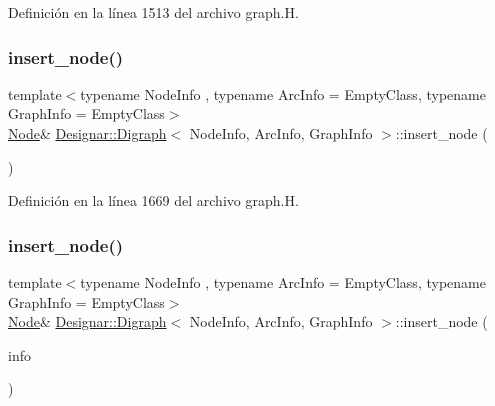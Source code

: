 Definición en la línea 1513 del archivo graph.\+H.

\mbox{\label{class_designar_1_1_digraph_a6ee69792c537ce241a2e448da1b46f1b}} 
\subsubsection{\texorpdfstring{insert\+\_\+node()}{insert\_node()}\hspace{0.1cm}{\footnotesize\ttfamily [2/4]}}
{\footnotesize\ttfamily template$<$typename Node\+Info , typename Arc\+Info  = Empty\+Class, typename Graph\+Info  = Empty\+Class$>$ \\
\hyperlink{class_designar_1_1_digraph_a4dc921c41a480b7946a04170e997d8ae}{Node}\& \hyperlink{class_designar_1_1_digraph}{Designar\+::\+Digraph}$<$ Node\+Info, Arc\+Info, Graph\+Info $>$\+::insert\+\_\+node (\begin{DoxyParamCaption}{ }\end{DoxyParamCaption})\hspace{0.3cm}{\ttfamily [inline]}}



Definición en la línea 1669 del archivo graph.\+H.

\mbox{\label{class_designar_1_1_digraph_a292dae36c1ee1fa581013c908ecebd1c}} 
\subsubsection{\texorpdfstring{insert\+\_\+node()}{insert\_node()}\hspace{0.1cm}{\footnotesize\ttfamily [3/4]}}
{\footnotesize\ttfamily template$<$typename Node\+Info , typename Arc\+Info  = Empty\+Class, typename Graph\+Info  = Empty\+Class$>$ \\
\hyperlink{class_designar_1_1_digraph_a4dc921c41a480b7946a04170e997d8ae}{Node}\& \hyperlink{class_designar_1_1_digraph}{Designar\+::\+Digraph}$<$ Node\+Info, Arc\+Info, Graph\+Info $>$\+::insert\+\_\+node (\begin{DoxyParamCaption}\item[{const Node\+Info \&}]{info }\end{DoxyParamCaption})\hspace{0.3cm}{\ttfamily [inline]}}



